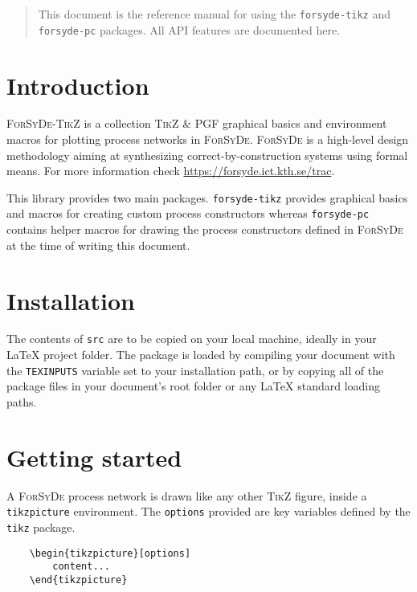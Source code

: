 \documentclass[10pt]{article}
\newcommand\bookmark[1]{\marginpar{\ttfamily #1}}
\begin{document}
\maketitle
\reversemarginpar

\begin{abstract}
This document is the reference manual for using the \texttt{forsyde-tikz} and \texttt{forsyde-pc} packages.  All API features are documented here.
\end{abstract}

\section{Introduction}

\textsc{ForSyDe-TikZ} is a collection \textsc{TikZ} \& \textsc{PGF} graphical basics and environment macros for plotting process networks in \textsc{ForSyDe}. \textsc{ForSyDe} is a high-level design methodology aiming at synthesizing correct-by-construction systems using formal means. For more information check  \url{https://forsyde.ict.kth.se/trac}.

This library provides two main packages. \texttt{forsyde-tikz} provides graphical basics and macros for creating custom process constructors whereas \texttt{forsyde-pc} contains helper macros for drawing the process constructors defined in \textsc{ForSyDe} at the time of writing this document.

\section{Installation}

The contents of \texttt{src} are to be copied on your local machine, ideally in your LaTeX  project folder. The package is loaded by compiling your document with the \texttt{TEXINPUTS} variable set to your installation path, or by copying all of the package files in your document's root folder or any LaTeX  standard loading paths. 

\section{Getting started}

A \textsc{ForSyDe} process network is drawn like any other \textsc{TikZ} figure, inside a \texttt{tikzpicture} environment. The \texttt{options} provided are key variables defined by the \texttt{tikz} package. \bookmark{environment}

\begin{verbatim}
	\begin{tikzpicture}[options]
		content...
	\end{tikzpicture}
\end{verbatim}
\end{document}
